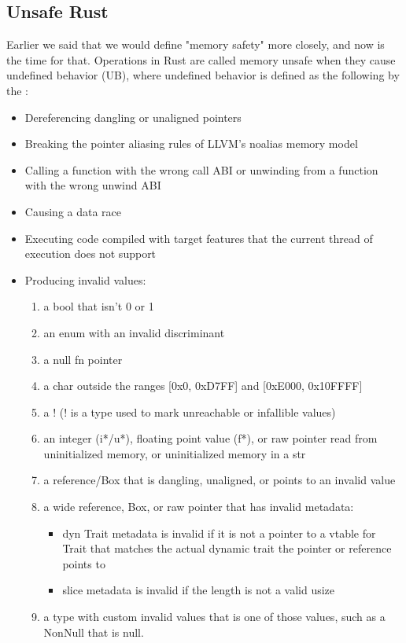 \subsection{Unsafe Rust}
\label{sec:background:rust:unsafe}

Earlier we said that we would define "memory safety" more closely, and now is the time for that.
Operations in Rust are called memory unsafe when they cause undefined behavior (UB),
where undefined behavior is defined as the following by the \cite{Rustonomicon}:
\begin{itemize}
    \item Dereferencing dangling or unaligned pointers
    \item Breaking the pointer aliasing rules of LLVM's noalias memory model
    \item Calling a function with the wrong call ABI or unwinding from a function with the wrong unwind ABI
    \item Causing a data race
    \item Executing code compiled with target features that the current thread of execution does not support
    \item Producing invalid values:
          \begin{enumerate}
              \item a bool that isn't 0 or 1
              \item an enum with an invalid discriminant
              \item a null fn pointer
              \item a char outside the ranges [0x0, 0xD7FF] and [0xE000, 0x10FFFF]
              \item a ! (! is a type used to mark unreachable or infallible values)
              \item an integer (i*/u*), floating point value (f*), or raw pointer read from uninitialized memory, or uninitialized memory in a str
              \item a reference/Box that is dangling, unaligned, or points to an invalid value
              \item a wide reference, Box, or raw pointer that has invalid metadata:
                    \begin{itemize}
                        \item dyn Trait metadata is invalid if it is not a pointer to a vtable for Trait that matches the actual dynamic trait the pointer or reference points to
                        \item slice metadata is invalid if the length is not a valid usize
                    \end{itemize}
              \item a type with custom invalid values that is one of those values, such as a NonNull that is null.
          \end{enumerate}
\end{itemize}

